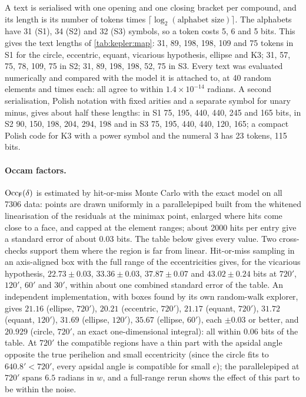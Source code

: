 A text is serialised with one opening and one closing bracket per compound, and its length is its number of tokens times $\lceil\log_2(\text{alphabet size})\rceil$. The alphabets have 31 (S1), 34 (S2) and 32 (S3) symbols, so a token costs 5, 6 and 5 bits. This gives the text lengths of \cref{tab:kepler:map}: 31, 89, 198, 198, 109 and 75 tokens in S1 for the circle, eccentric, equant, vicarious hypothesis, ellipse and $\mathrm{K3}$; 31, 57, 75, 78, 109, 75 in S2; 31, 89, 198, 198, 52, 75 in S3. Every text was evaluated numerically and compared with the model it is attached to, at 40 random elements and times each: all agree to within $1.4\times10^{-14}$ radians. A second serialisation, Polish notation with fixed arities and a separate symbol for unary minus, gives about half these lengths: in S1 75, 195, 440, 440, 245 and 165 bits, in S2 90, 150, 198, 204, 294, 198 and in S3 75, 195, 440, 440, 120, 165; a compact Polish code for $\mathrm{K3}$ with a power symbol and the numeral 3 has 23 tokens, 115 bits.

\paragraph{Occam factors.} $\mathrm{Occ}_{\mathsf F}(\delta)$ is estimated by hit-or-miss Monte Carlo with the exact model on all 7306 data: points are drawn uniformly in a parallelepiped built from the whitened linearisation of the residuals at the minimax point, enlarged where hits come close to a face, and capped at the element ranges; about 2000 hits per entry give a standard error of about $0.03$ bits. The table below gives every value. Two cross-checks support them where the region is far from linear. Hit-or-miss sampling in an axis-aligned box with the full range of the eccentricities gives, for the vicarious hypothesis, $22.73\pm0.03$, $33.36\pm0.03$, $37.87\pm0.07$ and $43.02\pm0.24$ bits at $720'$, $120'$, $60'$ and $30'$, within about one combined standard error of the table. An independent implementation, with boxes found by its own random-walk explorer, gives $21.16$ (ellipse, $720'$), $20.21$ (eccentric, $720'$), $21.17$ (equant, $720'$), $31.72$ (equant, $120'$), $31.69$ (ellipse, $120'$), $35.67$ (ellipse, $60'$), each $\pm0.03$ or better, and $20.929$ (circle, $720'$, an exact one-dimensional integral): all within $0.06$ bits of the table. At $720'$ the compatible regions have a thin part with the apsidal angle opposite the true perihelion and small eccentricity (since the circle fits to $640.8'<720'$, every apsidal angle is compatible for small $e$); the parallelepiped at $720'$ spans $6.5$ radians in $w$, and a full-range rerun shows the effect of this part to be within the noise.

